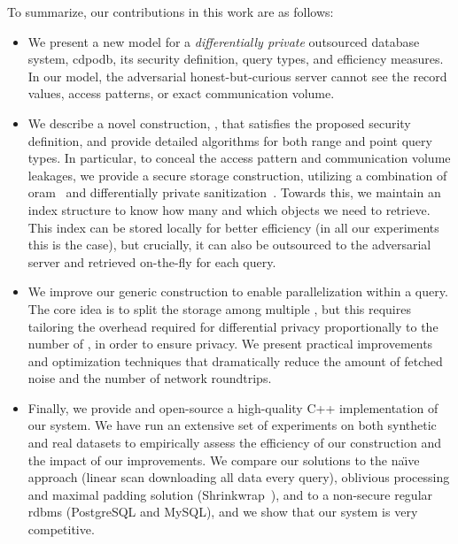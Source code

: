 	To summarize, our contributions in this work are as follows:
	\begin{itemize}
		\item
			We present a new model for a \emph{differentially private} outsourced database system, \acrshort{cdpodb}, its security definition, query types, and efficiency measures.
			In our model, the adversarial honest-but-curious server cannot see the record values, access patterns, or exact communication volume.

		\item
			We describe a novel construction, \epsolute{}, that satisfies the proposed security definition, and provide detailed algorithms for both range and point query types.
			In particular, to conceal the access pattern and communication volume leakages, we provide a secure storage construction, utilizing a combination of \acrlong{oram}~\cite{oram-theory, oram-original} and differentially private sanitization~\cite{non-interactive-database-privacy}.
			Towards this, we maintain an index structure to know how many and which objects we need to retrieve.
			This index can be stored locally for better efficiency (in all our experiments this is the case), but crucially, it can also be outsourced to the adversarial server and retrieved on-the-fly for each query.

		\item
			We improve our generic construction to enable parallelization within a query.
			The core idea is to split the storage among multiple , but this requires tailoring the overhead required for differential privacy proportionally to the number of , in order to ensure privacy.
			We present practical improvements and optimization techniques that dramatically reduce the amount of fetched noise and the number of network roundtrips.

		\item
			Finally, we provide and open-source a high-quality C++ implementation of our system.
			We have run an extensive set of experiments on both synthetic and real datasets to empirically assess the efficiency of our construction and the impact of our improvements.
			We compare our solutions to the na\"{\i}ve approach (linear scan downloading all data every query), oblivious processing and maximal padding solution (Shrinkwrap~\cite{shrinkwrap}), and to a non-secure regular \acrshort{rdbms} (PostgreSQL and MySQL), and we show that our system is very competitive.
	\end{itemize}


